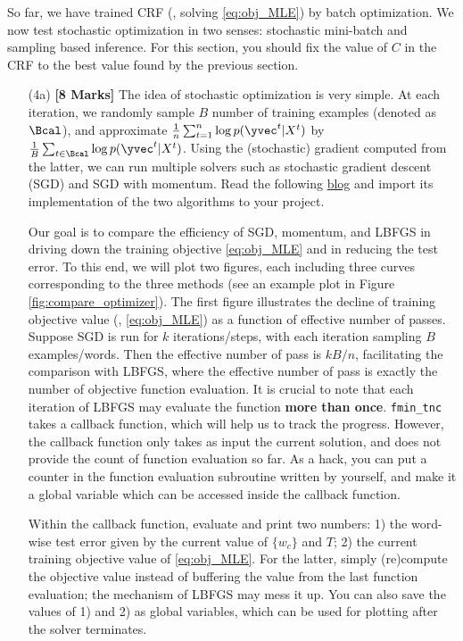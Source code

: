 \documentclass[11pt]{report}
\begin{document}
So far, we have trained CRF (\ie, solving \eqref{eq:obj_MLE}) by batch optimization.
We now test stochastic optimization in two senses:
stochastic mini-batch and sampling based inference.
For this section, you should fix the value of $C$ in the CRF to the best value found by the previous section.
%
\begin{itemize}
	\item[(4a)] {\bf [8 Marks]}
	 The idea of stochastic optimization is very simple. 
	At each iteration, we randomly sample $B$ number of training examples (denoted as $\Bcal$), 
	and approximate $\frac{1}{n}\sum_{t=1}^n \log p(\yvec^t | X^t)$
	by $\frac{1}{B}\sum_{t\in \Bcal} \log p(\yvec^t | X^t)$.
	Using the (stochastic) gradient computed from the latter, 
	we can run multiple solvers such as stochastic gradient descent (SGD)
	and SGD with momentum.
	Read the following \href{https://machinelearningmastery.com/gradient-descent-with-momentum-from-scratch/}{blog} and import its implementation of the two algorithms to your project.
	
	
	Our goal is to compare the efficiency of SGD, momentum, and LBFGS in driving down the training objective \eqref{eq:obj_MLE} and in reducing the test error.
	To this end, we will plot two figures, each including three curves corresponding to the  three methods (see an example plot in Figure \ref{fig:compare_optimizer}).
	The first figure illustrates the decline of training objective value (\ie, \eqref{eq:obj_MLE}) as a function of effective number of passes.
	Suppose SGD is run for $k$ iterations/steps, with each iteration sampling $B$ examples/words.
	Then the effective number of pass is $kB/n$,
	facilitating the comparison with LBFGS,
	where the effective number of pass is exactly the number of objective function evaluation.
	It is crucial to note that each iteration of LBFGS may evaluate the function \textbf{more than once}.
	\verb#fmin_tnc# takes a callback function, which will help us to track the progress.
	However, the callback function only takes as input the current solution,
	and does not provide the count of function evaluation so far.
	As a hack, you can put a counter in the function evaluation subroutine written by yourself,
	and make it a global variable which can be accessed inside the callback function.
	
	Within the callback function, evaluate and print two numbers: 
	1) the word-wise test error given by the current value of $\{w_c\}$ and $T$;
	2) the current training objective value of \eqref{eq:obj_MLE}.
	For the latter, simply (re)compute the objective value instead of buffering the value from the last function evaluation; the mechanism of LBFGS may mess it up.
	You can also save the values of 1) and 2) as global variables,
	which can be used for plotting after the solver terminates.
	 

\end{itemize}
\end{document}
